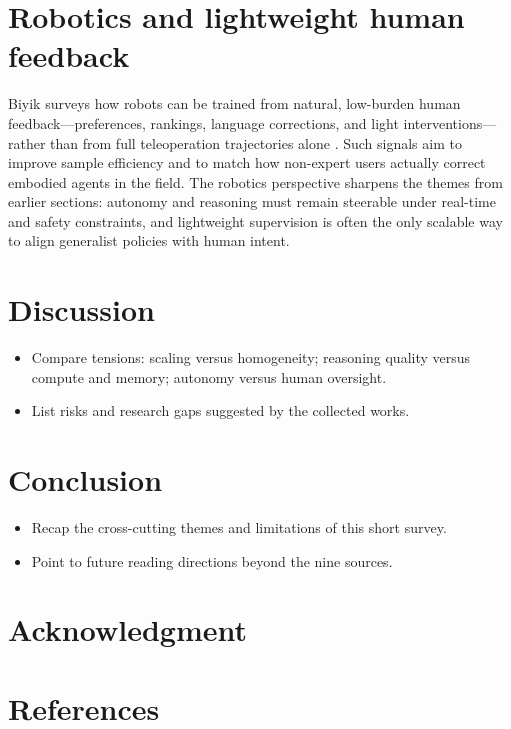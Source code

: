 \documentclass[conference]{IEEEtran}
\begin{document}
\section{Robotics and lightweight human feedback}
Biyik surveys how robots can be trained from natural, low-burden human feedback---preferences, rankings, language corrections, and light interventions---rather than from full teleoperation trajectories alone \cite{biyik2025robots}. Such signals aim to improve sample efficiency and to match how non-expert users actually correct embodied agents in the field. The robotics perspective sharpens the themes from earlier sections: autonomy and reasoning must remain steerable under real-time and safety constraints, and lightweight supervision is often the only scalable way to align generalist policies with human intent.

\section{Discussion}
\begin{itemize}
    \item Compare tensions: scaling versus homogeneity; reasoning quality versus compute and memory; autonomy versus human oversight.
    \item List risks and research gaps suggested by the collected works.
\end{itemize}

\section{Conclusion}
\begin{itemize}
    \item Recap the cross-cutting themes and limitations of this short survey.
    \item Point to future reading directions beyond the nine sources.
\end{itemize}

\section*{Acknowledgment}

\section*{References}
\end{document}
